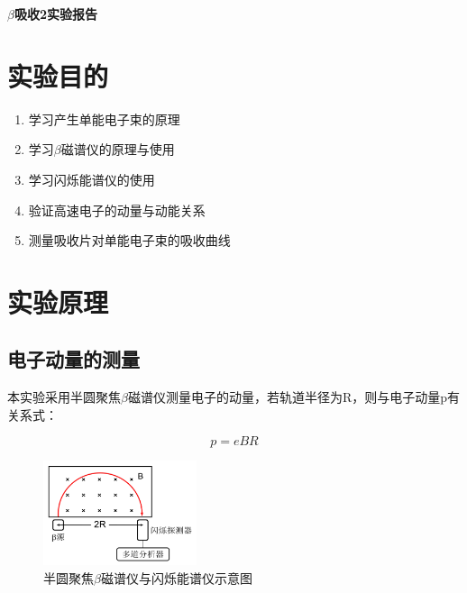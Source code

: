 \documentclass[a4paper,UTF8]{ctexart}
\begin{document}
\begin{center}
    \textbf{\Large $\beta$吸收2实验报告}
    \par {}
\end{center}

\section{实验目的}

\begin{enumerate}
    \item 学习产生单能电子束的原理
    \item 学习$\beta$磁谱仪的原理与使用
    \item 学习闪烁能谱仪的使用
    \item 验证高速电子的动量与动能关系
    \item 测量吸收片对单能电子束的吸收曲线
\end{enumerate}

\section{实验原理}

\subsection{电子动量的测量}

本实验采用半圆聚焦$\beta$磁谱仪测量电子的动量，若轨道半径为R，则与电子动量p有关系式：

\begin{equation}
    p = eBR
\end{equation}

\begin{figure}[H]
    \centering
    \begin{minipage}[b]{0.9\textwidth}
        \centering
        \includegraphics[width=0.4\textwidth]{./m.png}
        \caption{半圆聚焦$\beta$磁谱仪与闪烁能谱仪示意图}
    \end{minipage}
\end{figure}
\end{document}
